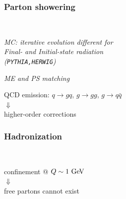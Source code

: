 \begin{frame}\frametitle{Parton showering}
\centering\myskip


\begin{minipage}{.5\textwidth}\centering
$\quad$
\end{minipage}\begin{minipage}{.45\textwidth}\centering
\begin{flushright}\footnotesize {\it MC: iterative evolution different for\\Final- and Initial-state radiation\\\myskip (\texttt{PYTHIA,HERWIG})}\end{flushright}
\begin{flushright}\footnotesize {\it ME and PS matching}\end{flushright}
\end{minipage}

\vspace{.35\paperheight}


QCD emission: $q\to gq$, $g\to gg$, $g\to q\bar{q}$\\
{\LARGE $\Downarrow$}\\
higher-order corrections 


\end{frame}

\begin{frame}\frametitle{Hadronization}
\centering


\begin{minipage}{.25\textwidth}\centering
$\quad$
\end{minipage}\begin{minipage}{.7\textwidth}\centering
{}
\end{minipage}

\vspace{.25\paperheight}

{\cccolor confinement} @ $Q\sim 1\gev$\\
{\LARGE $\Downarrow$}\\
free partons cannot exist


\end{frame}


